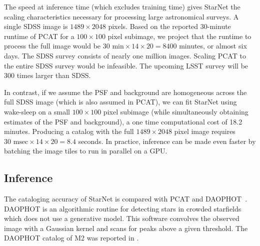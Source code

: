 The speed at inference time (which excludes training time) gives StarNet the scaling characteristics necessary for processing large astronomical surveys. 
A single SDSS image is $1489 \times 2048$ pixels. 
Based on the reported 30-minute runtime of PCAT for a $100\times100$ pixel subimage, we project that
the runtime to process the full image would be $30\text{ min} \times 14 \times 20 = 8400$ minutes, or almost six days. 
The SDSS survey consists of nearly one million images. Scaling PCAT to the entire SDSS survey would be infeasible.
The upcoming LSST survey will be 300 times larger than SDSS.

In contrast, if we assume the PSF and background are homogeneous 
across the full SDSS image (which is also assumed in PCAT), we can 
fit StarNet using wake-sleep 
on a small $100 \times 100$ pixel subimage
(while simultaneously obtaining estimates of the PSF and background),
a one time computational cost of 18.2 minutes. 
Producing a catalog with the full $1489 \times 2048$ pixel image requires
$30\text{ msec} \times 14 \times 20 = 8.4$ seconds. In practice, 
inference can be made even faster by batching the image tiles to run in parallel on a GPU.



\subsection{Inference}
\label{sec:results_on_m2_inference}
The cataloging accuracy of StarNet is compared with PCAT and DAOPHOT~\citep{stetson2987daophot}. 
DAOPHOT is an algorithmic routine for detecting stars in crowded starfields which does not use a generative model. 
This software convolves the observed image with a Gaussian kernel and scans for peaks above a given threshold. 
The DAOPHOT catalog of M2 was reported in \cite{An_2008_m2}. 



